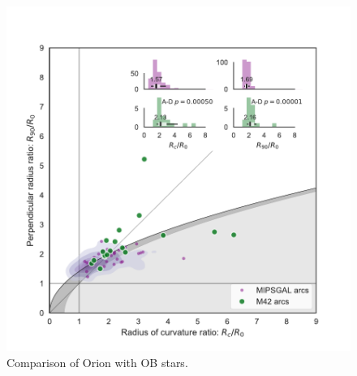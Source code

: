 \begin{figure}
  \centering
  \includegraphics[width=\linewidth]{figs/mipsgal-Rc-R90-vs-Orion}
  \caption[]{Comparison of Orion with OB stars.}
  \label{fig:ll-compare-mipsgal}
\end{figure}




